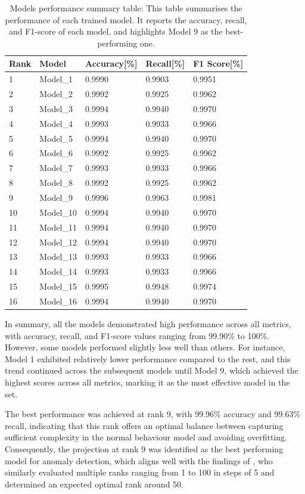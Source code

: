 \documentclass[pdflatex,sn-mathphys-num]{sn-jnl}
\theoremstyle{thmstyleone}
\theoremstyle{thmstyletwo}
\theoremstyle{thmstylethree}
\begin{document}
\begin{table}
\caption{Models performance summary table: This table summarises the performance of each trained model. It reports the accuracy, recall, and F1-score of each model, and highlights Model 9 as the best-performing one.}\label{tab:model_comparison}
\begin{tabular}{@{}lllll@{}}
\toprule
\textbf{Rank} & \textbf{Model} & \textbf{Accuracy[\%]} & \textbf{Recall[\%]} & \textbf{F1 Score[\%]} \\
\midrule
1 & Model\_1 & 0.9990 & 0.9903 & 0.9951 \\
2 & Model\_2 & 0.9992 & 0.9925 & 0.9962 \\
3 & Model\_3 & 0.9994 & 0.9940 & 0.9970 \\
4 & Model\_4 & 0.9993 & 0.9933 & 0.9966 \\
5 & Model\_5 & 0.9994  & 0.9940 & 0.9970 \\
6 & Model\_6 & 0.9992  & 0.9925 & 0.9962 \\
7 & Model\_7 & 0.9993 & 0.9933 & 0.9966 \\
8 & Model\_8 & 0.9992 & 0.9925 & 0.9962 \\
9 & Model\_9 & 0.9996  & 0.9963 & 0.9981 \\
10 & Model\_10 & 0.9994 & 0.9940 & 0.9970 \\
11 & Model\_11 & 0.9994 & 0.9940 & 0.9970 \\
12 & Model\_12 & 0.9994 & 0.9940 & 0.9970 \\
13 & Model\_13 & 0.9993 & 0.9933 & 0.9966 \\
14 & Model\_14 & 0.9993 & 0.9933 & 0.9966 \\
15 & Model\_15 & 0.9995 & 0.9948 & 0.9974 \\
16 & Model\_16 & 0.9994 & 0.9940 & 0.9970 \\
\bottomrule
\end{tabular}
\end{table}

In summary, all the models demonstrated high performance across all metrics, with accuracy, recall, and F1-score values ranging from 99.90\% to 100\%. However, some models performed slightly less well than others. For instance, Model 1 exhibited relatively lower performance compared to the rest, and this trend continued across the subsequent models until Model 9, which achieved the highest scores across all metrics, marking it as the most effective model in the set.  

The best performance was achieved at rank 9, with 99.96\% accuracy and 99.63\% recall, indicating that this rank offers an optimal balance between capturing sufficient complexity in the normal behaviour model and avoiding overfitting. Consequently, the projection at rank 9 was identified as the best performing model for anomaly detection, which aligns well with the findings of \cite{eren2023general}, who similarly evaluated multiple ranks ranging from 1 to 100 in steps of 5 and determined an expected optimal rank around 50. 
\end{document}

